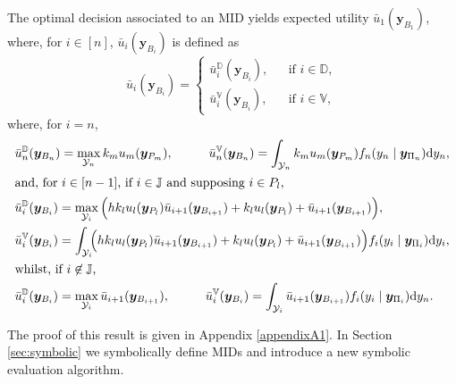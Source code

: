 \begin{proposition}
\label{i-th}
The optimal decision associated to an MID yields expected utility $\bar{u}_1(\bm{y}_{B_1})$, where, for $i\in[n]$, $\bar{u}_i(\bm{y}_{B_i})$ is defined as
\begin{equation*}
\label{eq:id1}
\bar{u}_i(\bm{y}_{B_i})=\left\{
\begin{array}{lcl}
\bar{u}_i^{\mathbb{D}}(\bm{y}_{B_i}),&&\mbox{if } i\in\mathbb{D},\\
\bar{u}_i^{\mathbb{V}}(\bm{y}_{B_i}),&&\mbox{if } i\in\mathbb{V},
\end{array}
\right.
\end{equation*}
where, for $i=n$,
\begin{align}
&\bar{u}_n^{\mathbb{D}}(\bm{y}_{B_n})=\max_{\mathcal{Y}_n}k_mu_m(\bm{y}_{P_m}),\hspace{1cm }\bar{u}_n^{\mathbb{V}}(\bm{y}_{B_n})=\int_{\mathcal{Y}_n}k_mu_m(\bm{y}_{P_m})f_n(y_n\;|\;\bm{y}_{\Pi_n})\dr y_n,\label{cond4}\\
\intertext{and, for $i\in[n-1]$, if $i\in \mathbb{J}$ and supposing $i\in P_l$,}
&\bar{u}_i^{\mathbb{D}}(\bm{y}_{B_i})=\max_{\mathcal{Y}_i}\Big(hk_lu_l(\bm{y}_{P_l})\bar{u}_{i+1}(\bm{y}_{B_{i+1}})+k_lu_l(\bm{y}_{P_l})+\bar{u}_{i+1}(\bm{y}_{B_{i+1}})\Big),\label{cond2}\\
&\bar{u}_i^{\mathbb{V}}(\bm{y}_{B_i})=\int_{\mathcal{Y}_i}\hspace{-0.15cm}\Big(hk_lu_l(\bm{y}_{P_l})\bar{u}_{i{+1}}(\bm{y}_{B_{i{+1}}})+k_lu_l(\bm{y}_{P_l})+\bar{u}_{i{+1}}(\bm{y}_{B_{i{+1}}})\Big)f_i(y_i\;|\;\bm{y}_{\Pi_i})\dr y_i\label{cond3},\\
\intertext{whilst, if $i\not\in\mathbb{J}$,}
&\bar{u}_i^{\mathbb{D}}(\bm{y}_{B_i})=\max_{\mathcal{Y}_i}\bar{u}_{i+1}(\bm{y}_{B_{i+1}}),\hspace{1cm}\bar{u}_i^{\mathbb{V}}(\bm{y}_{B_i})=\int_{\mathcal{Y}_i}\bar{u}_{i+1}(\bm{y}_{B_{i+1}})f_i(y_i\;|\;\bm{y}_{\Pi_i})\dr y_n.\label{cond1}
\end{align}
\end{proposition}
The proof of this result is given in Appendix \ref{appendixA1}. In Section \ref{sec:symbolic} we symbolically define MIDs and introduce a new symbolic evaluation algorithm.

